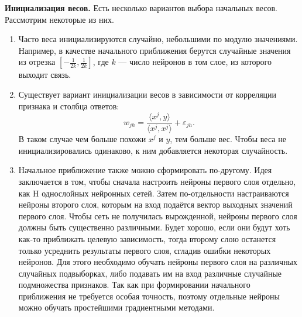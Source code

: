 \documentclass[specialist, 12pt, 
subf, %
href, colorlinks=true,
substylefile = spbu.rtx,
]{disser}
\begin{document}
\textbf{Инициализация весов.} 
Есть несколько вариантов выбора начальных весов. Рассмотрим некоторые из них.
\begin{enumerate}
\item Часто веса инициализируются случайно, небольшими по модулю значениями. Например, в качестве начального приближения берутся случайные значения из отрезка $[-\frac{1}{2k}, \frac{1}{2k}]$, где $k$ --- число нейронов в том слое, из которого выходит связь.
\item Существует вариант инициализации весов в зависимости от корреляции признака и столбца ответов:
\begin{equation*}
w_{jh}=\frac{\langle x^j, y\rangle}{\langle x^j, x^j\rangle} + \varepsilon_{jh}.
\end{equation*}
В таком случае чем больше похожи $x^j$ и $y$, тем больше вес. Чтобы веса не инициализировались одинаково, к ним добавляется некоторая случайность. 

\item Начальное приближение также можно сформировать по-другому. Идея заключается в том, чтобы сначала настроить нейроны первого слоя отдельно, как H однослойных нейронных сетей. Затем по-отдельности настраиваются нейроны второго слоя, которым на вход подаётся вектор выходных значений первого слоя. Чтобы сеть не получилась вырожденной, нейроны первого слоя должны быть существенно различными. Будет хорошо, если они будут хоть как-то приближать целевую зависимость, тогда второму слою останется только усреднить результаты первого слоя, сгладив ошибки некоторых нейронов. Для этого необходимо обучать нейроны первого слоя на различных случайных подвыборках, либо подавать им на вход различные случайные подмножества признаков. Так как при формировании начального приближения не требуется особая точность, поэтому отдельные нейроны можно обучать простейшими градиентными методами.

\end{enumerate}
\end{document}
